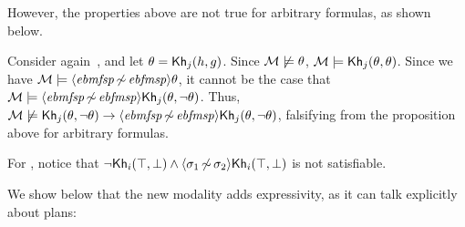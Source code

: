 However, the properties above are not true for arbitrary formulas, as shown below.

\medskip

\begin{example}
Consider again~, and let $\theta = {\sf Kh}_j(h,g)$. Since $\mathcal{M}\not\models\theta$, $\mathcal{M}\models{\sf Kh}_j(\theta,\theta)$. Since we have $\mathcal{M}\models\langle \mathit{ebmfsp}{\,\not\sim\,}\mathit{ebfmsp} \rangle\theta$, it cannot be the case that  $\mathcal{M} \models \langle \mathit{ebmfsp}{\,\not\sim\,}\mathit{ebfmsp} \rangle{\sf Kh}_j(\theta,\neg \theta)$. Thus, $\mathcal{M} \not\models {\sf Kh}_j(\theta,\neg \theta) \rightarrow \langle \mathit{ebmfsp}{\,\not\sim\,}\mathit{ebfmsp} \rangle{\sf Kh}_j(\theta,\neg \theta)$, falsifying  from the proposition above for arbitrary formulas.

For , notice that $\neg{\sf Kh}_i(\top,\bot) \wedge \langle \sigma_1{\,\not\sim\,}\sigma_2 \rangle{\sf Kh}_i(\top,\bot)$ is not satisfiable. 
\end{example}

\medskip

We show below that the new modality adds expressivity, as it can talk explicitly about plans:

\medskip

